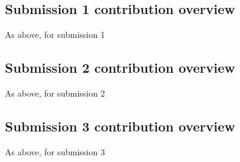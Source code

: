 \documentclass[a4paper, 11pt]{report}
\begin{document}
\subsection{Submission 1 contribution overview}

As above, for submission 1

\subsection{Submission 2 contribution overview}

As above, for submission 2

\subsection{Submission 3 contribution overview}

As above, for submission 3



\newpage
\printbibliography
\end{document}
